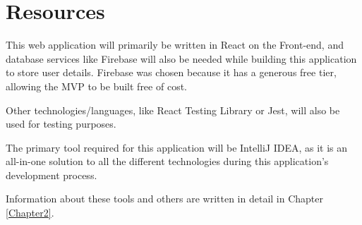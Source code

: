 \section{Resources}
This web application will primarily be written in React on the Front-end, and database services like Firebase will also be needed while building this application to store user details. Firebase was chosen because it has a generous free tier, allowing the MVP to be built free of cost. 

Other technologies/languages, like React Testing Library or Jest, will also be used for testing purposes.

The primary tool required for this application will be IntelliJ IDEA, as it is an all-in-one solution to all the different technologies during this application's development process. 

Information about these tools and others are written in detail in Chapter \ref{Chapter2}.

